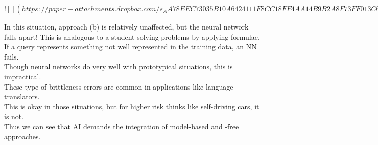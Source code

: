 \documentclass[../../lecture_notes.tex]{subfiles}
\begin{document}
\newpage
$![](https://paper-attachments.dropbox.com/s_AA78EEC73035B10A6424111F8CC18FF4AA14B9B2A8F73FF013C6765837E92F61_1591304763546_Untitled+drawing+4.jpg)$
\newpage

\noindent In this situation, approach (b) is relatively unaffected, but the neural network falls apart!
This is analogous to a student solving problems by applying formulae.\\
If a query represents something not well represented in the training data, an NN fails.\\
Though neural networks do very well with prototypical situations, this is impractical.\\
	\indent These type of brittleness errors are common in applications like language translators.\\
	\indent This is okay in those situations, but for higher risk thinks like self-driving cars, it is not.\\
Thus we can see that AI demands the integration of model-based and -free approaches.
\end{document}

